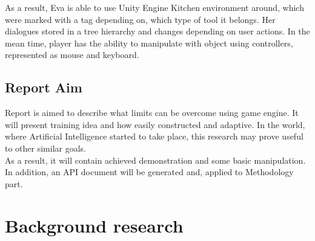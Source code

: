 \documentclass[18pt]{article}
\numberwithin{equation}{section} %
\numberwithin{figure}{section} %
\numberwithin{table}{section} %
\begin{document}
	As a result, Eva is able to use Unity Engine Kitchen environment around, which were marked with a tag depending on, which type of tool it belongs. Her dialogues stored in a tree hierarchy and changes depending on user actions. In the mean time, player has the ability to manipulate with object using controllers, represented as mouse and keyboard.
\subsection{Report Aim}
	Report is aimed to describe what limits can be overcome using game engine. It will present training idea and how easily constructed and adaptive. In the world, where Artificial Intelligence started to take place, this research may prove useful to other similar goals.\\
	
	As a result, it will contain achieved demonstration and some basic manipulation. In addition, an API document will be generated and, applied to Methodology part.
	
\section{Background research}	
\end{document}
